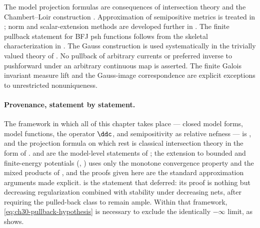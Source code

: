 The model projection formulas are consequences of intersection theory and
the Chambert--Loir construction \cite{CL06}.  Approximation of semipositive
metrics is treated in \cite{GM19}; norm and scalar-extension methods are
developed further in \cite{BE21}.  The finite pullback statement for BFJ psh
functions follows from the skeletal characterization in \cite{BFJ16}.  The
Gauss construction is used systematically in the trivially valued theory of
\cite{BJ22}.  No pullback of arbitrary currents or preferred inverse to
pushforward under an arbitrary continuous map is asserted.
The finite Galois invariant measure lift and the Gauss-image
correspondence are explicit exceptions to unrestricted nonuniqueness.

\paragraph{Provenance, statement by statement.}
The framework in which all of this chapter takes place --- closed model
forms, model functions, the operator $\ddc$, and semipositivity as
relative nefness --- is \cite[\S\S2 and 4--5]{BFJ16}, and the projection
formula  on which
 rest is classical intersection
theory in the form of \cite[\S1.4 and \S2.3]{Ful}.
 and
 are the model-level statements of
\cite[\S2]{BFJ16}; the extension to bounded and finite-energy potentials
(,
) uses only the monotone convergence
property \cite[Theorem~3.1]{BFJ15} and the mixed products of
\cite[\S6]{BFJ15}, and the proofs given here are the standard
approximation arguments made explicit.
 is the statement that
 deferred: its proof is nothing but decreasing
regularization \cite[Theorem~8.3]{BFJ16} combined with stability under
decreasing nets, after requiring the pulled-back class to remain ample.
Within that framework, \eqref{eq:ch30-pullback-hypothesis} is necessary to
exclude the identically $-\infty$ limit, as
 shows.

